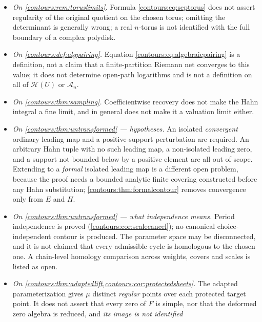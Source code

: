 \documentclass[11pt,letterpaper]{article}
\theoremstyle{definition}
\theoremstyle{remark}
\newcommand{\HH}{\mathcal H}\newcommand{\A}{\mathscr A}\newcommand{\OO}{\mathcal O}
\numberwithin{equation}{section}
\begin{document}
\begin{itemize}
factor, since $AF$ can introduce extra zeros; and $F$ and $G$ are not claimed to have
identical zero schemes.  records that one of the merged
sources judged the general realization unproved, and that the alternative route
\cref{contours:thm:septorus} is conditional on \cite{Geometry}.
\item \emph{On \cref{contours:rem:toruslimits}.} Formula
\eqref{contours:eq:septorus} does not assert regularity of the original quotient on
the chosen torus; omitting the determinant is generally wrong; a real $n$-torus is not
identified with the full boundary of a complex polydisk.
\item \emph{On \cref{contours:def:algpairing}.} Equation
\eqref{contours:eq:algebraicpairing} is a definition, not a claim that a
finite-partition Riemann net converges to this value; it does not determine open-path
logarithms and is not a definition on all of $\HH(U)$ or $\A_n$.
\item \emph{On \cref{contours:thm:sampling}.} Coefficientwise recovery does not make
the Hahn integral a fine limit, and in general does not make it a valuation limit
either.
\item \emph{On \cref{contours:thm:untransformed} --- hypotheses.} An isolated
\emph{convergent} ordinary leading map and a positive-support perturbation are
required. An arbitrary Hahn tuple with no such leading map, a non-isolated
leading zero, and a support not bounded below by a positive element are all out
of scope. Extending to a \emph{formal} isolated leading map is a different open
problem, because the proof needs a bounded analytic finite covering constructed
before any Hahn substitution; \cref{contours:thm:formalcontour} removes
convergence only from $E$ and $H$.
\item \emph{On \cref{contours:thm:untransformed} --- what independence means.}
Period independence is proved (\cref{contours:cor:scalecancel}); no canonical
choice-independent contour is produced. The parameter space may be disconnected,
and it is not claimed that every admissible cycle is homologous to the chosen
one. A chain-level homology comparison across weights, covers and scales is
listed as open.
\item \emph{On \cref{contours:thm:adaptedlift,contours:cor:protectedsheets}.} The
adapted parameterization gives $\mu$ distinct \emph{regular} points over each
protected target point. It does not assert that every zero of $F$ is simple, nor
that the deformed zero algebra is reduced, and \emph{its image is not identified
}
\end{itemize}
\end{document}
